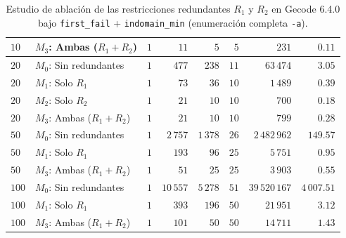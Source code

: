 \begin{table}[htbp]
\begin{tabular}{llrrrrrr}
        $10$  & $M_3$: Ambas ($R_1 + R_2$)      & $1$ & $11$      & $5$      & $5$  & $231$         & $0.11$ \\
        \midrule
        $20$  & $M_0$: Sin redundantes          & $1$ & $477$     & $238$    & $11$ & $63\,474$     & $3.05$ \\
        $20$  & $M_1$: Solo $R_1$               & $1$ & $73$      & $36$     & $10$ & $1\,489$      & $0.39$ \\
        $20$  & $M_2$: Solo $R_2$               & $1$ & $21$      & $10$     & $10$ & $700$         & $0.18$ \\
        $20$  & $M_3$: Ambas ($R_1 + R_2$)      & $1$ & $21$      & $10$     & $10$ & $799$         & $0.28$ \\
        \midrule
        $50$  & $M_0$: Sin redundantes          & $1$ & $2\,757$  & $1\,378$ & $26$ & $2\,482\,962$ & $149.57$ \\
        $50$  & $M_1$: Solo $R_1$               & $1$ & $193$     & $96$     & $25$ & $5\,751$      & $0.95$ \\
        $50$  & $M_3$: Ambas ($R_1 + R_2$)      & $1$ & $51$      & $25$     & $25$ & $3\,903$      & $0.55$ \\
        \midrule
        $100$ & $M_0$: Sin redundantes          & $1$ & $10\,557$ & $5\,278$ & $51$ & $39\,520\,167$& $4\,007.51$ \\
        $100$ & $M_1$: Solo $R_1$               & $1$ & $393$     & $196$    & $50$ & $21\,951$     & $3.12$ \\
        $100$ & $M_3$: Ambas ($R_1 + R_2$)      & $1$ & $101$     & $50$     & $50$ & $14\,711$     & $1.43$ \\
        \bottomrule
    \end{tabular}
    \caption{Estudio de ablación de las restricciones redundantes $R_1$ y $R_2$ en Gecode 6.4.0 bajo \texttt{first\_fail} + \texttt{indomain\_min} (enumeración completa \texttt{-a}).}
    \label{tab:secuencia_ablacion}
\end{table}

